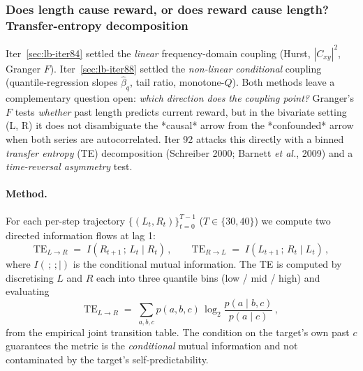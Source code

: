 \subsubsection{Does length cause reward, or does reward cause length?
Transfer-entropy decomposition}\label{sec:lb-iter92}

Iter~\ref{sec:lb-iter84} settled the \emph{linear} frequency-domain
coupling (Hurst, $|\!C_{xy}\!|^2$, Granger $F$).  Iter~\ref{sec:lb-iter88}
settled the \emph{non-linear conditional} coupling (quantile-regression
slopes $\hat\beta_q$, tail ratio, monotone-$Q$).  Both methods leave a
complementary question open: \emph{which direction does the coupling
point?}  Granger's $F$ tests \emph{whether} past length predicts
current reward, but in the bivariate setting (L, R) it does not
disambiguate the *causal* arrow from the *confounded* arrow when both
series are autocorrelated.  Iter 92 attacks this directly with a
binned \emph{transfer entropy} (TE) decomposition
(Schreiber 2000; Barnett \emph{et al.}, 2009) and a
\emph{time-reversal asymmetry} test.

\paragraph{Method.}
For each per-step trajectory $\{(L_t, R_t)\}_{t=0}^{T-1}$ ($T\!\in\!\{30,
40\}$) we compute two directed information flows at lag 1:
\[
\mathrm{TE}_{L\to R} \;=\; I(R_{t+1}\,;\,L_t \mid R_t) \,,\qquad
\mathrm{TE}_{R\to L} \;=\; I(L_{t+1}\,;\,R_t \mid L_t) \,,
\]
where $I(\,;\,; \mid)$ is the conditional mutual information.
The TE is computed by discretising $L$ and $R$ each into three
quantile bins (low / mid / high) and evaluating
\[
\mathrm{TE}_{L\to R} \;=\; \sum_{a,b,c} p(a,b,c)\,
       \log_2\!\frac{p(a\mid b,c)}{p(a\mid c)} \,,
\]
from the empirical joint transition table.  The condition on the
target's own past $c$ guarantees the metric is the \emph{conditional}
mutual information and not contaminated by the target's
self-predictability.

